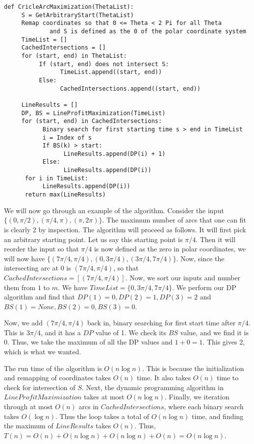 \documentclass[psamsfonts]{amsart}
\newenvironment{sol}{{\bfseries Solution}}{\qedsymbol}
\theoremstyle{definition}
\theoremstyle{remark}
\numberwithin{equation}{section}
\begin{document}
\begin{sol}
\begin{verbatim}
def CricleArcMaximization(ThetaList):
     S = GetArbitraryStart(ThetaList)
     Remap coordinates so that 0 <= Theta < 2 Pi for all Theta
             and S is defined as the 0 of the polar coordinate system
     TimeList = []
     CachedIntersections = []
     for (start, end) in ThetaList:
          If (start, end) does not intersect S:
                TimeList.append((start, end))
          Else:
                CachedIntersections.append((start, end))

     LineResults = []
     DP, BS = LineProfitMaximization(TimeList)
     for (start, end) in CachedIntersections:
           Binary search for first starting time s > end in TimeList
           i = Index of s
           If BS(k) > start:
                 LineResults.append(DP(i) + 1)
           Else:
                 LineResults.append(DP(i))
      for i in TimeList:
           LineResults.append(DP(i))
      return max(LineResults)
\end{verbatim}

We will now go through an example of the algorithm. Consider the input $\{ (0, \pi/2), (\pi/4, \pi), (\pi, 2\pi) \}$. The maximum number of arcs that one can fit is clearly 2 by inspection. The algorithm will proceed as follows. It will first pick an arbitrary starting point. Let us say this starting point is $\pi/4$. Then it will reorder the input so that $\pi/4$ is now defined as the zero in polar coordinates, we will now have $\{(7\pi/4, \pi/4), (0, 3\pi/4), (3 \pi/4, 7\pi/4) \}$. Now, since the intersecting arc at $0$ is $(7\pi/4, \pi/4)$, so that $CachedIntersections = [(7\pi/4, \pi/4)]$. Now, we sort our inputs and number them from $1$ to $m$. We have $TimeList = \{ 0, 3\pi/4, 7\pi/4 \}$. We perform our DP algorithm and find that $DP(1) = 0, DP(2) = 1, DP(3) = 2$ and $BS(1) = None, BS(2) = 0, BS(3) = 0$. 

Now, we add $(7\pi/4, \pi/4)$ back in, binary searching for first start time after $\pi/4$. This is $3 \pi/4$, and it has a $DP$ value of 1. We check its $BS$ value, and we find it is 0. Thus, we take the maximum of all the DP values and $1 + 0 = 1$. This gives 2, which is what we wanted.

The run time of the algorithm is $O(n \log n)$. This is because the initialization and remapping of coordinates takes $O(n)$ time. It also takes $O(n)$ time to check for intersection of $S$. Next, the dynamic programming algorithm in $LineProfitMaximization$ takes at most $O(n \log n)$. Finally, we iteration through at most $O(n)$ arcs in $CachedIntersections$, where each binary search takes $O(\log n)$. Thus the loop takes a total of $O(n \log n)$ time, and finding the maximum of $LineResults$ takes $O(n)$. Thus, $T(n) = O(n) + O(n \log n) + O(n \log n) + O(n) = O(n \log n)$. 


\end{sol}
\end{document}
